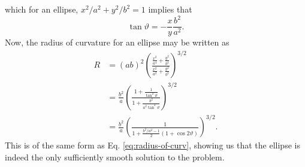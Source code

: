 which for an ellipse, $x^2/a^2 + y^2/b^2 = 1$ implies that 
\begin{equation}
    \tan \vartheta = - \frac{x}{y} \frac{b^2}{a^2}.
\end{equation}
Now, the radius of curvature for an ellipse may be written as
\begin{equation}
\begin{aligned}
    R &= (ab)^2 \left( \frac{\frac{x^2}{a^4} + \frac{y^2}{b^4}}{\frac{x^2}{a^2} + \frac{y^2}{b^2}} \right)^{3/2} \\
    &= \frac{b^2}{a} \left( \frac{1 + \frac{1}{\tan^2 \vartheta}}{1 + \frac{b^2}{a^2\tan^2 \vartheta}} \right)^{3/2} \\
    &=\frac{b^2}{a} \left( \frac{1}{1 + \frac{b^2/a^2-1}{2} (1 + \cos 2 \vartheta )} \right)^{3/2}.
\end{aligned}
\end{equation}
This is of the same form as Eq. \eqref{eq:radius-of-curv}, showing us that the ellipse is indeed the only sufficiently smooth solution to the problem.

